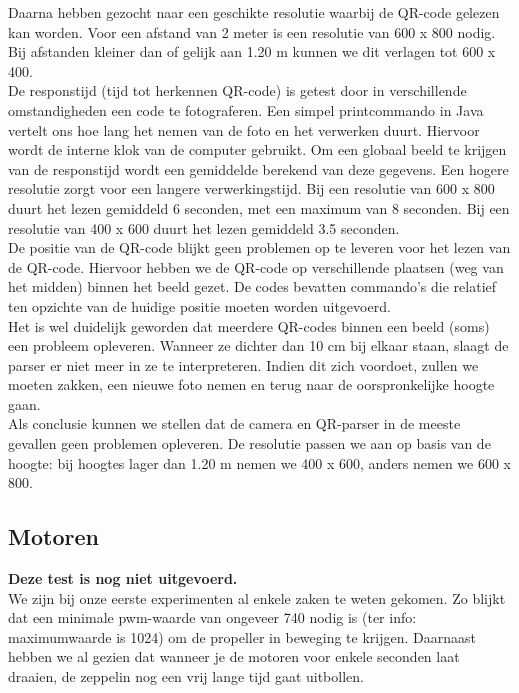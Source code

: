 \documentclass[eind]{penoverslag}
\begin{document}
Daarna hebben gezocht naar een geschikte resolutie waarbij de QR-code gelezen kan worden. Voor een afstand van 2 meter is een resolutie van 600 x 800 nodig. Bij afstanden kleiner dan of gelijk aan 1.20 m kunnen we dit verlagen tot 600 x 400. \\

De responstijd (tijd tot herkennen QR-code) is getest door in verschillende omstandigheden een code te fotograferen. Een simpel printcommando in Java vertelt ons hoe lang het nemen van de foto en het verwerken duurt. Hiervoor wordt de interne klok van de computer gebruikt. Om een globaal beeld te krijgen van de responstijd wordt een gemiddelde berekend van deze gegevens. Een hogere resolutie zorgt voor een langere verwerkingstijd. Bij een resolutie van 600 x 800 duurt het lezen gemiddeld 6 seconden, met een maximum van 8 seconden. Bij een resolutie van 400 x 600 duurt het lezen gemiddeld 3.5 seconden. \\

De positie van de QR-code blijkt geen problemen op te leveren voor het lezen van de QR-code. Hiervoor hebben we de QR-code op verschillende plaatsen (weg van het midden) binnen het beeld gezet. De codes bevatten commando’s die relatief ten opzichte van de huidige positie moeten worden uitgevoerd. \\

Het is wel duidelijk geworden dat meerdere QR-codes binnen een beeld (soms) een probleem opleveren. Wanneer ze dichter dan 10 cm bij elkaar staan, slaagt de parser er niet meer in ze te interpreteren. Indien dit zich voordoet, zullen we moeten zakken, een nieuwe foto nemen en terug naar de oorspronkelijke hoogte gaan. \\

Als conclusie kunnen we stellen dat de camera en QR-parser in de meeste gevallen geen problemen opleveren. De resolutie passen we aan op basis van de hoogte: bij hoogtes lager dan 1.20 m nemen we 400 x 600, anders nemen we 600 x 800. \\


\subsection{Motoren}
\textbf{Deze test is nog niet uitgevoerd.} \\

We zijn bij onze eerste experimenten al enkele zaken te weten gekomen. Zo blijkt dat een minimale pwm-waarde van ongeveer 740 nodig is (ter info: maximumwaarde is 1024) om de propeller in beweging te krijgen. Daarnaast hebben we al gezien dat wanneer je de motoren voor enkele seconden laat draaien, de zeppelin nog een vrij lange tijd gaat uitbollen. \\
\end{document}
